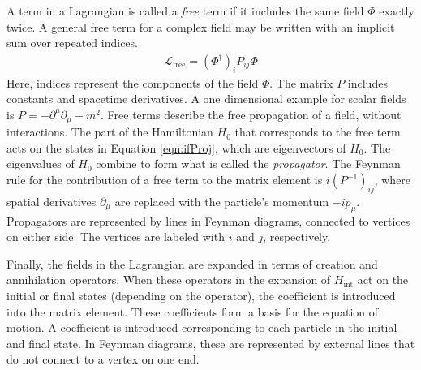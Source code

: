 A term in a Lagrangian is called a \emph{free} term if it includes the same field $\Phi$ exactly twice.
A general free term for a complex field may be written with an implicit sum over repeated indices.
\begin{equation}\begin{split}\label{eqn:feynmanRuleProp}
\mathcal{L}_\text{free}=(\Phi^\dagger)_iP_{ij}\Phi
\end{split}\end{equation} 
Here, indices represent the components of the field $\Phi$.
The matrix $P$ includes constants and spacetime derivatives. A one dimensional example for scalar fields is $P=-\partial^\mu\partial_\mu-m^2$.
Free terms describe the free propagation of a field, without interactions.
The part of the Hamiltonian $H_0$ that corresponds to the free term acts on the states in Equation \ref{eqn:ifProj}, which are eigenvectors of $H_0$.
The eigenvalues of $H_0$ combine to form what is called the \emph{propagator}.
The Feynman rule for the contribution of a free term to the matrix element is $i(P^{-1})_{ij}$, where spatial derivatives $\partial_\mu$ are replaced with the particle's momentum $-ip_\mu$.
Propagators are represented by lines in Feynman diagrams, connected to vertices on either side. The vertices are labeled with $i$ and $j$, respectively.

Finally, the fields in the Lagrangian are expanded in terms of creation and annihilation operators.
When these operators in the expansion of $H_\text{int}$ act on the initial or final states (depending on the operator), the coefficient is introduced into the matrix element.
These coefficients form a basis for the equation of motion.
A coefficient is introduced corresponding to each particle in the initial and final state.
In Feynman diagrams, these are represented by external lines that do not connect to a vertex on one end.
